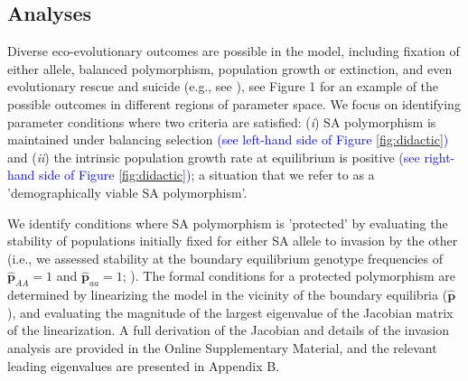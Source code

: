 \documentclass[11pt]{article}
\def\mbf#1{\mathbf{#1}}
\begin{document}




\subsection*{Analyses} \label{subsec:analyses}

Diverse eco-evolutionary outcomes are possible in the model, including fixation of either allele, balanced polymorphism, population growth or extinction, and even evolutionary rescue and suicide (e.g., see \citealt{deVriesCaswell2019a,deVriesCaswell2019b}), see Figure 1 for an example of the possible outcomes in different regions of parameter space. We focus on identifying parameter conditions where two criteria are satisfied: ({\itshape i}) SA polymorphism is maintained under balancing selection \textcolor{blue}{(see left-hand side of Figure \ref{fig:didactic})} and ({\itshape ii}) the intrinsic population growth rate at equilibrium is positive \textcolor{blue}{(see right-hand side of Figure \ref{fig:didactic})}; a situation that we refer to as a 'demographically viable SA polymorphism'.

We identify conditions where SA polymorphism is 'protected' by evaluating the stability of populations initially fixed for either SA allele to invasion by the other (i.e., we assessed stability at the boundary equilibrium genotype frequencies of $\hat{\mbf{p}}_{AA} = 1$ and $\hat{\mbf{p}}_{aa} = 1$; \citealt{Levene1953, Prout1968, deVriesCaswell2019b}). The formal conditions for a protected polymorphism are determined by linearizing the model in the vicinity of the boundary equilibria ($\hat{\mbf{p}}$), and evaluating the magnitude of the largest eigenvalue of the Jacobian matrix of the linearization. A full derivation of the Jacobian and details of the invasion analysis are provided in the Online Supplementary Material, and the relevant leading eigenvalues are presented in Appendix B.
\end{document}
